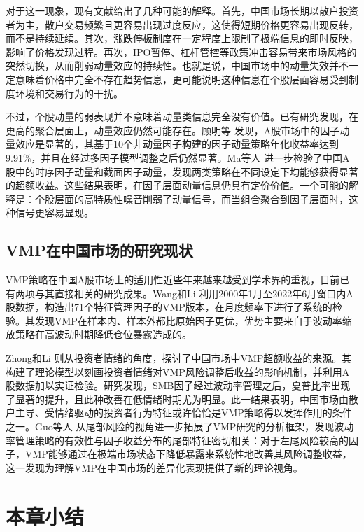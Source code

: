 \documentclass[
    decl-page,
    oneside,
  ]{njuthesis}
\begin{document}
对于这一现象，现有文献给出了几种可能的解释。首先，中国市场长期以散户投资者为主，散户交易频繁且更容易出现过度反应，这使得短期价格更容易出现反转，而不是持续延续。其次，涨跌停板制度在一定程度上限制了极端信息的即时反映，影响了价格发现过程。再次，IPO暂停、杠杆管控等政策冲击容易带来市场风格的突然切换，从而削弱动量效应的持续性。也就是说，中国市场中的动量失效并不一定意味着价格中完全不存在趋势信息，更可能说明这种信息在个股层面容易受到制度环境和交易行为的干扰。

不过，个股动量的弱表现并不意味着动量类信息完全没有价值。已有研究发现，在更高的聚合层面上，动量效应仍然可能存在。顾明等 \cite{guming2024factor}发现，A股市场中的因子动量效应是显著的，其基于10个非动量因子构建的因子动量策略年化收益率达到$9.91\%$，并且在经过多因子模型调整之后仍然显著。Ma等人 \cite{jiang2024factormomentum} 进一步检验了中国A股中的时序因子动量和截面因子动量，发现两类策略在不同设定下均能够获得显著的超额收益。这些结果表明，在因子层面动量信息仍具有定价价值。一个可能的解释是：个股层面的高特质性噪音削弱了动量信号，而当组合聚合到因子层面时，这种信号更容易显现。

\subsection{VMP在中国市场的研究现状}

VMP策略在中国A股市场上的适用性近些年来越来越受到学术界的重视，目前已有两项与其直接相关的研究成果。Wang和Li \cite{wang2024vmp} 利用2000年1月至2022年6月窗口内A股数据，构造出71个特征管理因子的VMP版本，在月度频率下进行了系统的检验。其发现VMP在样本内、样本外都比原始因子更优，优势主要来自于波动率缩放策略在高波动时期降低仓位暴露造成的。

Zhong和Li \cite{zhong2024sentiment} 则从投资者情绪的角度，探讨了中国市场中VMP超额收益的来源。其构建了理论模型以刻画投资者情绪对VMP风险调整后收益的影响机制，并利用A股数据加以实证检验。研究发现，SMB因子经过波动率管理之后，夏普比率出现了显著的提升，且此种改善在低情绪时期尤为明显。此一结果表明，中国市场由散户主导、受情绪驱动的投资者行为特征或许恰恰是VMP策略得以发挥作用的条件之一。Guo等人 \cite{guo2024tailrisk} 从尾部风险的视角进一步拓展了VMP研究的分析框架，发现波动率管理策略的有效性与因子收益分布的尾部特征密切相关：对于左尾风险较高的因子，VMP能够通过在极端市场状态下降低暴露来系统性地改善其风险调整收益，这一发现为理解VMP在中国市场的差异化表现提供了新的理论视角。

\section{本章小结}
\end{document}
